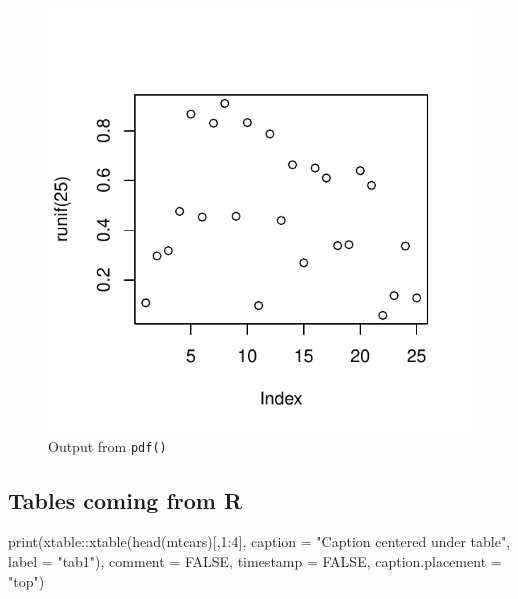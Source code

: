 \documentclass[useAMS,usenatbib,referee]{biom}
\newenvironment{Shaded}{\begin{snugshade}}{\end{snugshade}}
\newcommand{\AttributeTok}[1]{\textcolor[rgb]{0.77,0.63,0.00}{#1}}
\newcommand{\ConstantTok}[1]{\textcolor[rgb]{0.00,0.00,0.00}{#1}}
\newcommand{\DecValTok}[1]{\textcolor[rgb]{0.00,0.00,0.81}{#1}}
\newcommand{\FunctionTok}[1]{\textcolor[rgb]{0.00,0.00,0.00}{#1}}
\newcommand{\NormalTok}[1]{#1}
\newcommand{\SpecialCharTok}[1]{\textcolor[rgb]{0.00,0.00,0.00}{#1}}
\newcommand{\StringTok}[1]{\textcolor[rgb]{0.31,0.60,0.02}{#1}}
\begin{document}
\begin{figure}
\centering
\includegraphics{BJAII_files/figure-latex/fig2-1.pdf}
\caption{Output from \texttt{pdf()}}
\end{figure}

\clearpage

\hypertarget{tables-coming-from-r}{%
\subsection{Tables coming from R}\label{tables-coming-from-r}}

\begin{Shaded}
\begin{Highlighting}[]
\FunctionTok{print}\NormalTok{(xtable}\SpecialCharTok{::}\FunctionTok{xtable}\NormalTok{(}\FunctionTok{head}\NormalTok{(mtcars)[,}\DecValTok{1}\SpecialCharTok{:}\DecValTok{4}\NormalTok{], }
\AttributeTok{caption =} \StringTok{"Caption centered under table"}\NormalTok{, }\AttributeTok{label =} \StringTok{"tab1"}\NormalTok{), }
\AttributeTok{comment =} \ConstantTok{FALSE}\NormalTok{, }\AttributeTok{timestamp =} \ConstantTok{FALSE}\NormalTok{, }\AttributeTok{caption.placement =} \StringTok{"top"}\NormalTok{)}
\end{Highlighting}
\end{Shaded}
\end{document}
